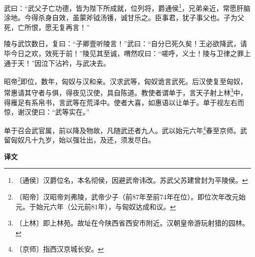 \documentclass[12pt,UTF-8,openany,a4]{ctexbook}
\begin{document}
\begin{large}
    武曰：“武父子亡功德，皆为陛下所成就，位列将，爵通侯\footnote{〔通侯〕\yiwen 汉爵位名，本名彻侯，因避武帝讳改。苏武父苏建曾封为平陵侯。}，兄弟亲近，常愿肝脑涂地。今得杀身自效，虽蒙斧钺汤镬，诚甘乐之。臣事君，犹子事父也。子为父死，亡所恨，愿无复再言！”
    
    陵与武饮数日，复曰：“子卿壹听陵言！”武曰：“自分已死久矣！王必欲降武，请毕今日之欢，效死于前！”陵见其至诚，喟然叹曰：“嗟呼，义士！陵与卫律之罪上通于天！”因泣下沾衿，与武决去。
    
    昭帝\footnote{〔昭帝〕\yiwen 汉昭帝刘弗陵，武帝少子（前87年至前74年在位）。即位次年改元始元。于始元六年（公元前81年），与匈奴达成和议。}即位，数年，匈奴与汉和亲。汉求武等，匈奴诡言武死。后汉使复至匈奴，常惠请其守者与俱，得夜见汉使，具自陈道。教使者谓单于，言天子射上林\footnote{〔上林〕\yiwen 即上林苑。故址在今陕西省西安市附近。汉朝皇帝游玩射猎的园林。}中，得雁足有系帛书，言武等在荒泽中。使者大喜，如惠语以让单于。单于视左右而惊，谢汉使曰：“武等实在。”
    
    单于召会武官属，前以降及物故，凡随武还者九人。武以始元六年\footnote{〔京师〕\yiwen 指西汉京城长安。}春至京师。武留匈奴凡十九岁，始以强壮出，及还，须发尽白。
\end{large}


\newpage

\begin{Large}
    \noindent\textbf{译文}
\end{Large}


\vspace{1em}
\end{document}
